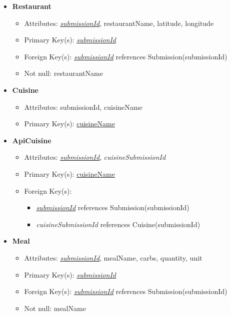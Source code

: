 \begin{itemize}
        \item \textbf{Restaurant}
        \begin{itemize}
            \item Attributes: \underline{\textit{submissionId}}, restaurantName, latitude, longitude
            \item Primary Key(s): \underline{\textit{submissionId}}
            \item Foreign Key(s): \underline{\textit{submissionId}} references Submission(submissionId)
            \item Not null: restaurantName
        \end{itemize}
    
        \item \textbf{Cuisine}
        \begin{itemize}
            \item Attributes: submissionId, cuisineName
            \item Primary Key(s): \underline{cuisineName}        
        \end{itemize}

        \item \textbf{ApiCuisine}
        \begin{itemize}
            \item Attributes: \underline{\textit{submissionId}}, \textit{cuisineSubmissionId}
            \item Primary Key(s): \underline{cuisineName}
            \item Foreign Key(s):
                \begin{itemize}
                    \item \underline{\textit{submissionId}} references Submission(submissionId)
                    \item \textit{cuisineSubmissionId} references Cuisine(submissionId)
                \end{itemize}
        \end{itemize}

        \item \textbf{Meal}
        \begin{itemize}
            \item Attributes: \underline{\textit{submissionId}}, mealName, carbs, quantity, unit
            \item Primary Key(s): \underline{\textit{submissionId}}
            \item Foreign Key(s): \underline{\textit{submissionId}} references Submission(submissionId)
            \item Not null: mealName
        \end{itemize}


\end{itemize}
